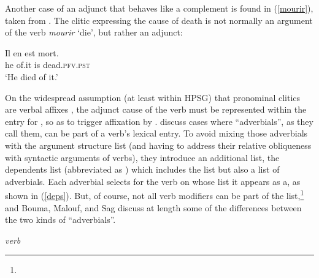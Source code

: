 \documentclass[output=paper
 	        ,biblatex
                ,babelshorthands
                ,newtxmath
                ,draftmode
                ,colorlinks, citecolor=brown
]{langscibook}
\begin{document}
Another case of an adjunct that behaves like a complement is found in (\ref{mourir}), taken from \citep[81]{KoenigandDavis2006}.  The clitic  expressing the cause of death   is not normally an argument of the verb \textit{mourir} `die', but rather an adjunct: %

\ea
\label{mourir}
\gll Il en est mort. \\
     he of.it is dead.\textsc{pfv.pst} \\
\glt `He died of it.'
\z

\noindent
On the widespread assumption (at least within HPSG) that pronominal clitics are verbal affixes \citep{MillerandSag1997}, the adjunct cause of the verb  must be represented within the entry for , so as to trigger affixation by . \citet{Boumaetal2001} discuss cases where ``adverbials'', as they call them, can be part of a verb's lexical entry. To avoid mixing those adverbials with the argument structure list (and having to address their relative obliqueness with syntactic arguments of verbs), they introduce  an additional list, the dependents list (abbreviated as \deps) which includes the \argst list but also a list of adverbials. Each adverbial selects for the verb on whose \deps list it appears as a, as shown in (\ref{deps}). But, of course, not all verb modifiers can be part of the \deps list,\footnote{%
} and Bouma, Malouf, and Sag discuss at length some of the differences between the two kinds of ``adverbials''.

\begin{exe}
\ex\label{deps}
\emph{verb} \impl
{}
\end{exe}
\end{document}
